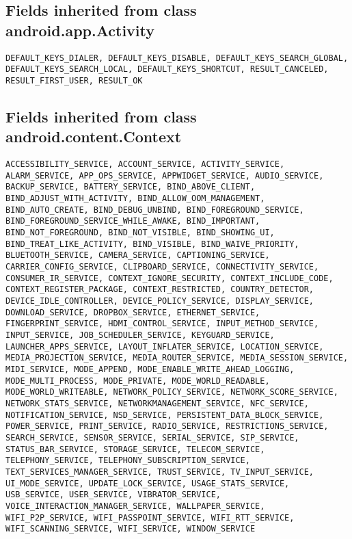 \subsection{Fields inherited from class android.app.Activity}


\begin{lstlisting}
DEFAULT_KEYS_DIALER, DEFAULT_KEYS_DISABLE, DEFAULT_KEYS_SEARCH_GLOBAL, DEFAULT_KEYS_SEARCH_LOCAL, DEFAULT_KEYS_SHORTCUT, RESULT_CANCELED, RESULT_FIRST_USER, RESULT_OK
\end{lstlisting}

\subsection{Fields inherited from class android.content.Context}

\begin{lstlisting}
ACCESSIBILITY_SERVICE, ACCOUNT_SERVICE, ACTIVITY_SERVICE, ALARM_SERVICE, APP_OPS_SERVICE, APPWIDGET_SERVICE, AUDIO_SERVICE, BACKUP_SERVICE, BATTERY_SERVICE, BIND_ABOVE_CLIENT, BIND_ADJUST_WITH_ACTIVITY, BIND_ALLOW_OOM_MANAGEMENT, BIND_AUTO_CREATE, BIND_DEBUG_UNBIND, BIND_FOREGROUND_SERVICE, BIND_FOREGROUND_SERVICE_WHILE_AWAKE, BIND_IMPORTANT, BIND_NOT_FOREGROUND, BIND_NOT_VISIBLE, BIND_SHOWING_UI, BIND_TREAT_LIKE_ACTIVITY, BIND_VISIBLE, BIND_WAIVE_PRIORITY, BLUETOOTH_SERVICE, CAMERA_SERVICE, CAPTIONING_SERVICE, CARRIER_CONFIG_SERVICE, CLIPBOARD_SERVICE, CONNECTIVITY_SERVICE, CONSUMER_IR_SERVICE, CONTEXT_IGNORE_SECURITY, CONTEXT_INCLUDE_CODE, CONTEXT_REGISTER_PACKAGE, CONTEXT_RESTRICTED, COUNTRY_DETECTOR, DEVICE_IDLE_CONTROLLER, DEVICE_POLICY_SERVICE, DISPLAY_SERVICE, DOWNLOAD_SERVICE, DROPBOX_SERVICE, ETHERNET_SERVICE, FINGERPRINT_SERVICE, HDMI_CONTROL_SERVICE, INPUT_METHOD_SERVICE, INPUT_SERVICE, JOB_SCHEDULER_SERVICE, KEYGUARD_SERVICE, LAUNCHER_APPS_SERVICE, LAYOUT_INFLATER_SERVICE, LOCATION_SERVICE, MEDIA_PROJECTION_SERVICE, MEDIA_ROUTER_SERVICE, MEDIA_SESSION_SERVICE, MIDI_SERVICE, MODE_APPEND, MODE_ENABLE_WRITE_AHEAD_LOGGING, MODE_MULTI_PROCESS, MODE_PRIVATE, MODE_WORLD_READABLE, MODE_WORLD_WRITEABLE, NETWORK_POLICY_SERVICE, NETWORK_SCORE_SERVICE, NETWORK_STATS_SERVICE, NETWORKMANAGEMENT_SERVICE, NFC_SERVICE, NOTIFICATION_SERVICE, NSD_SERVICE, PERSISTENT_DATA_BLOCK_SERVICE, POWER_SERVICE, PRINT_SERVICE, RADIO_SERVICE, RESTRICTIONS_SERVICE, SEARCH_SERVICE, SENSOR_SERVICE, SERIAL_SERVICE, SIP_SERVICE, STATUS_BAR_SERVICE, STORAGE_SERVICE, TELECOM_SERVICE, TELEPHONY_SERVICE, TELEPHONY_SUBSCRIPTION_SERVICE, TEXT_SERVICES_MANAGER_SERVICE, TRUST_SERVICE, TV_INPUT_SERVICE, UI_MODE_SERVICE, UPDATE_LOCK_SERVICE, USAGE_STATS_SERVICE, USB_SERVICE, USER_SERVICE, VIBRATOR_SERVICE, VOICE_INTERACTION_MANAGER_SERVICE, WALLPAPER_SERVICE, WIFI_P2P_SERVICE, WIFI_PASSPOINT_SERVICE, WIFI_RTT_SERVICE, WIFI_SCANNING_SERVICE, WIFI_SERVICE, WINDOW_SERVICE
\end{lstlisting}

